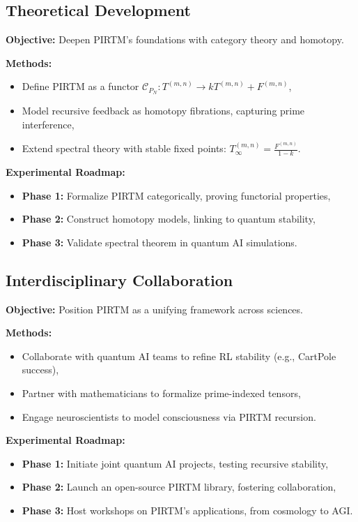 \documentclass{article}
\theoremstyle{plain}
\begin{document}
\subsection{Theoretical Development}
\textbf{Objective:} Deepen PIRTM’s foundations with category theory and homotopy.

\textbf{Methods:}
\begin{itemize}
    \item Define PIRTM as a functor \( \mathcal{C}_{P_N}: T^{(m,n)} \to k T^{(m,n)} + F^{(m,n)} \),
    \item Model recursive feedback as homotopy fibrations, capturing prime interference,
    \item Extend spectral theory with stable fixed points: \( T_\infty^{(m,n)} = \frac{F^{(m,n)}}{1 - k} \).
\end{itemize}

\textbf{Experimental Roadmap:}
\begin{itemize}
    \item \textbf{Phase 1:} Formalize PIRTM categorically, proving functorial properties,
    \item \textbf{Phase 2:} Construct homotopy models, linking to quantum stability,
    \item \textbf{Phase 3:} Validate spectral theorem in quantum AI simulations.
\end{itemize}

\subsection{Interdisciplinary Collaboration}
\textbf{Objective:} Position PIRTM as a unifying framework across sciences.

\textbf{Methods:}
\begin{itemize}
    \item Collaborate with quantum AI teams to refine RL stability (e.g., CartPole success),
    \item Partner with mathematicians to formalize prime-indexed tensors,
    \item Engage neuroscientists to model consciousness via PIRTM recursion.
\end{itemize}

\textbf{Experimental Roadmap:}
\begin{itemize}
    \item \textbf{Phase 1:} Initiate joint quantum AI projects, testing recursive stability,
    \item \textbf{Phase 2:} Launch an open-source PIRTM library, fostering collaboration,
    \item \textbf{Phase 3:} Host workshops on PIRTM’s applications, from cosmology to AGI.
\end{itemize}
\end{document}
